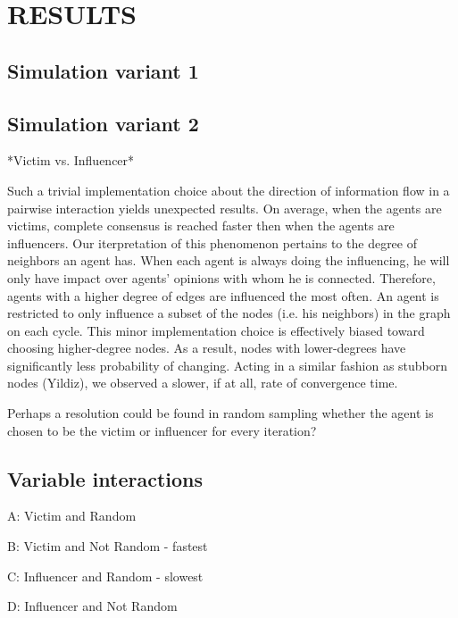 
\section{RESULTS}

\subsection{Simulation variant 1}






\subsection{Simulation variant 2}

*Victim vs. Influencer*

Such a trivial implementation choice about the direction of information flow 
in a pairwise interaction yields unexpected results. On average, when the 
agents are victims, complete consensus is reached faster then when the agents
are influencers. Our iterpretation of this phenomenon pertains to the degree
of neighbors an agent has. When each agent is always doing the influencing, 
he will only have impact over agents' opinions with whom he is connected. 
Therefore, agents with a higher degree of edges are influenced the most
often. An agent is restricted to only influence a subset of the nodes
(i.e. his neighbors) in the graph on each cycle. This minor implementation
choice is effectively biased toward choosing higher-degree nodes. As a result,
nodes with lower-degrees have significantly less probability of changing. 
Acting in a similar fashion as stubborn nodes (Yildiz), we observed a slower, 
if at all, rate of convergence time.

Perhaps a resolution could be found in random sampling whether the agent is chosen 
to be the victim or influencer for every iteration?


\subsection{Variable interactions}


A: Victim and Random


B: Victim and Not Random
- fastest

C: Influencer and Random
- slowest


D: Influencer and Not Random

